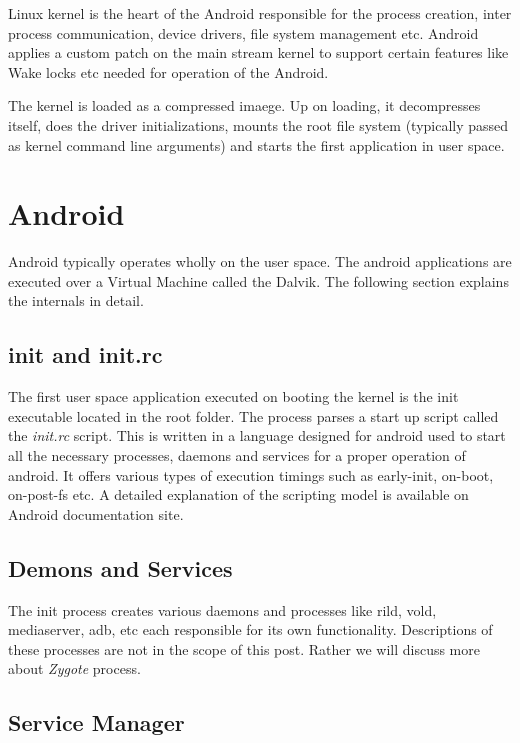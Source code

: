 Linux kernel is the heart of the Android responsible for the process creation, inter process communication, device drivers, file system management etc. Android applies a custom patch on the main stream kernel to support certain features like Wake locks etc needed for operation of the Android.

The kernel is loaded as a compressed imaege. Up on loading, it decompresses itself,
does the driver initializations, mounts the root file system (typically passed 
as kernel command line arguments) and starts the first application in user space.


\section{Android}

Android typically operates wholly on the user space. The android applications are executed over a Virtual Machine called the Dalvik. The following section explains the internals in detail.

\subsection{init and init.rc}

The first user space application executed on booting the kernel is the init
executable located in the root folder. The process parses a start up script
called the \textit{init.rc} script. This is written in a language designed
for android used to start all the necessary processes, daemons and services
for a proper operation of android. It offers various types of execution timings
such as early-init, on-boot, on-post-fs etc. A detailed explanation of the
scripting model is available on Android documentation site.

\subsection{Demons and Services}

The init process creates various daemons and processes like rild, vold,
mediaserver, adb, etc each responsible for its own functionality.
Descriptions of these processes are not in the scope of this post.
Rather we will discuss more about \textit{Zygote} process.

\subsection{Service Manager}

